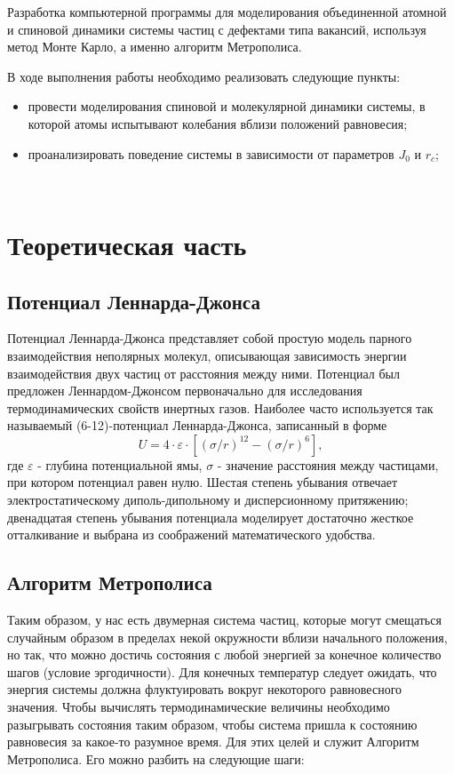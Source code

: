 \documentclass[14pt,a4paper,report]{ncc}
\begin{document}
Разработка компьютерной программы для моделирования объединенной атомной и спиновой динамики системы частиц с дефектами типа вакансий, используя метод Монте Карло, а именно алгоритм Метрополиса.
\


В ходе выполнения работы необходимо реализовать следующие пункты:
\
\begin{itemize}
\item провести моделирования спиновой и молекулярной динамики системы, в которой атомы испытывают колебания вблизи положений равновесия;
\item проанализировать поведение системы в зависимости от параметров $J_0$ и $r_c$;
\end{itemize}

\

\newpage\section{Теоретическая часть }
\subsection{Потенциал Леннарда-Джонса}
Потенциал Леннарда-Джонса представляет собой простую модель парного взаимодействия неполярных молекул, описывающая зависимость энергии взаимодействия двух частиц от расстояния между ними.
Потенциал был предложен Леннардом-Джонсом первоначально для исследования термодинамических свойств инертных газов. Наиболее часто используется так называемый (6-12)-потенциал Леннарда-Джонса, записанный в форме 
\
\begin{equation}
 U = 4 \cdot \varepsilon \cdot [(\sigma/r)^{12} - (\sigma/r)^{6}  ] ,
 \end{equation} 
где $\varepsilon$ - глубина потенциальной ямы, $\sigma$ - значение расстояния между частицами, при котором потенциал равен нулю. Шестая степень убывания отвечает электростатическому диполь-дипольному и дисперсионному притяжению; двенадцатая степень убывания потенциала моделирует достаточно жесткое отталкивание и выбрана из соображений математического удобства.
\
\subsection{Алгоритм Метрополиса}
Таким образом, у нас есть двумерная система частиц, которые могут смещаться случайным образом в пределах некой окружности вблизи начального положения, но так, что можно достичь состояния с любой энергией за конечное количество шагов (условие эргодичности). Для конечных температур следует ожидать, что энергия системы должна флуктуировать вокруг некоторого равновесного значения. Чтобы вычислять термодинамические величины необходимо разыгрывать состояния таким образом, чтобы система пришла к состоянию равновесия за какое-то разумное время. Для этих целей и служит Алгоритм Метрополиса. Его можно разбить на следующие шаги:
\end{document}
